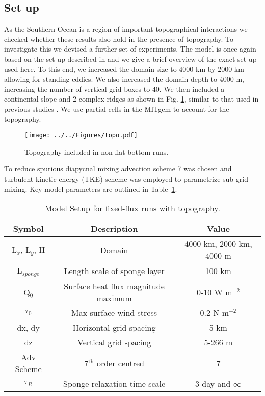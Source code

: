 \subsection{Set up}
As the Southern Ocean is a region of important topographical interactions \citep{Abernathey2014} we checked whether these results also hold in the presence of topography. To investigate this we devised a further set of experiments. The model is once again based on the set up described in  and we give a brief overview of the exact set up used here. To this end, we increased the domain size to 4000 km by 2000 km allowing for standing eddies. We also  increased the  domain depth to 4000 m, increasing the number of vertical grid boxes to 40. We then included a continental slope and 2 complex ridges as shown in Fig. \ref{fig:Topo}, similar to that used in previous studies \citep{hogg2010}. We use partial cells in the MITgcm to account for the topography.
\begin{figure}[H]
\center
\noindent \texttt{[image: ../../Figures/topo.pdf]} 
\caption{Topography included in non-flat bottom runs.}
\label{fig:Topo}
\end{figure}
To reduce spurious diapycnal mixing advection scheme 7 was chosen \citep{hill2012, Ilıcak2012} and turbulent kinetic energy (TKE) scheme \citep{Gaspar1990,Madec1998}  was employed to parametrize sub grid mixing. Key model parameters are outlined in Table~\ref{tab:setup2}.

\begin{table}[H]
\caption{Model Setup for fixed-flux runs with topography.}
\label{tab:setup2}
\begin{center}
\begin{tabular}{|c|c|c|}
\hline \hline
\textbf{Symbol} & \textbf{Description}  & \textbf{Value} \\ 
\hline 
L$_x$, L$_y$, H & Domain & 4000 km, 2000 km, 4000 m \\ 
\hline 
L$_{sponge}$ & Length scale of sponge layer & 100 km \\ 
\hline 
Q$_0$ & Surface heat flux magnitude maximum & 0-10 W m$^{-2}$ \\ 
\hline 
$\tau _0$ & Max surface wind stress & 0.2 N m$^{-2}$ \\ 
\hline 
dx, dy & Horizontal grid spacing & 5 km  \\ 
\hline 
dz & Vertical grid spacing & 5-266 m \\ 
\hline 
Adv Scheme & 7$^{\text{th}}$ order centred & 7 \\ 
\hline 
 $\tau_{R}$ & Sponge relaxation time scale & 3-day and  $\infty$  \\
\hline 
\end{tabular}
\end{center}
\end{table}

